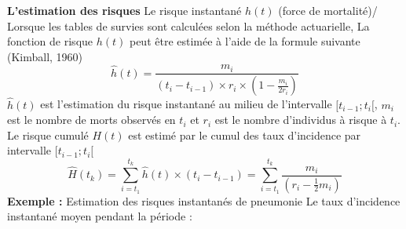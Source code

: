 \textbf{L'estimation des risques}
Le risque instantané $h(t)$ (force de mortalité)/ Lorsque les tables de survies sont calculées selon la méthode actuarielle, La fonction de risque $h(t)$ peut être estimée à l'aide de la formule suivante (Kimball, 1960)
$$\widehat{h}(t) = \frac{m_{i}}{(t_{i}-t_{i-1})\times r_{i} \times \left(1 - \frac{m_{i}}{2r_{i}}\right)}$$
$\widehat{h}(t)$ est l'estimation du risque instantané au milieu de l'intervalle $[t_{i-1} ; t_{i}[$, $m_{i}$ est le nombre de morts observés en $t_{i}$ et $r_{i}$ est le nombre d'individus à risque à $t_{i}$.\newline
Le risque cumulé $H(t)$ est estimé par le cumul des taux d'incidence par intervalle $[t_{i-1} ; t_{i}[$
$$\widehat{H}(t_{k}) = \sum_{i = t_{1}}^{t_{k}} \widehat{h}(t)\times (t_{i}-t_{i-1}) = \sum_{i = t_{1}}^{t_{k}} \frac{m_{i}}{\left( r_{i} - \frac{1}{2}m_{i}\right)}$$
\textbf{Exemple : } Estimation des risques instantanés de pneumonie\newline
Le taux d'incidence instantané moyen pendant la période :

